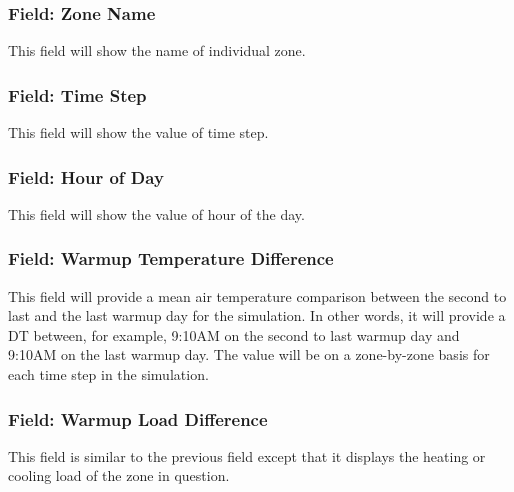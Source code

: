 \subsubsection{Field: Zone Name}

This field will show the name of individual zone.

\subsubsection{Field: Time Step}

This field will show the value of time step.

\subsubsection{Field: Hour of Day}

This field will show the value of hour of the day.

\subsubsection{Field: Warmup Temperature Difference}

This field will provide a mean air temperature comparison between the second to last and the last warmup day for the simulation.  In other words, it will provide a DT between, for example, 9:10AM on the second to last warmup day and 9:10AM on the last warmup day. The value will be on a zone-by-zone basis for each time step in the simulation.

\subsubsection{Field: Warmup Load Difference}

This field is similar to the previous field except that it displays the heating or cooling load of the zone in question.
